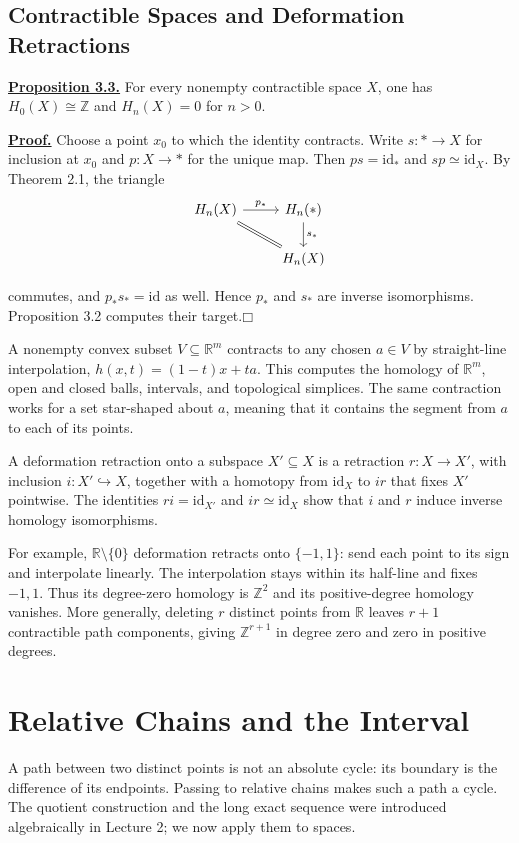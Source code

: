 \documentclass[11pt]{article}
\newcommand{\facehead}[1]{\par\Needspace{4\baselineskip}\subsection{#1}}
\begin{document}
\facehead{Contractible Spaces and Deformation Retractions}
\hypertarget{prop23}{}\textbf{\hyperlink{proof23}{Proposition 3.3.}} For every nonempty contractible space $X$, one has $H_0(X)\cong\mathbb Z$ and $H_n(X)=0$ for $n>0$.

\hypertarget{proof23}{}\textbf{\hyperlink{prop23}{Proof.}} Choose a point $x_0$ to which the identity contracts. Write $s:*\to X$ for inclusion at $x_0$ and $p:X\to *$ for the unique map. Then $ps=\mathrm{id}_*$ and $sp\simeq\mathrm{id}_X$. By Theorem 2.1, the triangle
\[
\begin{tikzcd}
H_n(X)\arrow[r,"p_*"]\arrow[dr,equal]&H_n(*)\arrow[d,"s_*"]\\
&H_n(X)
\end{tikzcd}
\]

commutes, and $p_*s_*=\mathrm{id}$ as well. Hence $p_*$ and $s_*$ are inverse isomorphisms. Proposition 3.2 computes their target.\hfill$\mdlgwhtsquare$

A nonempty convex subset $V\subseteq\mathbb R^m$ contracts to any chosen $a\in V$ by straight-line interpolation, $h(x,t)=(1-t)x+ta$. This computes the homology of $\mathbb R^m$, open and closed balls, intervals, and topological simplices. The same contraction works for a set star-shaped about $a$, meaning that it contains the segment from $a$ to each of its points.

A deformation retraction onto a subspace $X'\subseteq X$ is a retraction $r:X\to X'$, with inclusion $i:X'\hookrightarrow X$, together with a homotopy from $\mathrm{id}_X$ to $ir$ that fixes $X'$ pointwise. The identities $ri=\mathrm{id}_{X'}$ and $ir\simeq\mathrm{id}_X$ show that $i$ and $r$ induce inverse homology isomorphisms.

For example, $\mathbb R\setminus\{0\}$ deformation retracts onto $\{-1,1\}$: send each point to its sign and interpolate linearly. The interpolation stays within its half-line and fixes $-1,1$. Thus its degree-zero homology is $\mathbb Z^2$ and its positive-degree homology vanishes. More generally, deleting $r$ distinct points from $\mathbb R$ leaves $r+1$ contractible path components, giving $\mathbb Z^{r+1}$ in degree zero and zero in positive degrees.

\section{Relative Chains and the Interval}
A path between two distinct points is not an absolute cycle: its boundary is the difference of its endpoints. Passing to relative chains makes such a path a cycle. The quotient construction and the long exact sequence were introduced algebraically in Lecture 2; we now apply them to spaces.
\end{document}
